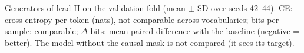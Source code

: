 \begin{table}[htbp]
\centering
\caption[Generators: ablations (validation)]{Generators of lead II on the validation fold (mean $\pm$ SD over seeds 42--44). CE: cross-entropy per token (nats), not comparable across vocabularies; bits per sample: comparable; $\Delta$ bits: mean paired difference with the baseline (negative = better). The model without the causal mask is not compared (it sees its target).}
\label{tab:generative_ablations}
\small
\begin{adjustbox}{max width=\textwidth}

\end{adjustbox}
\end{table}
